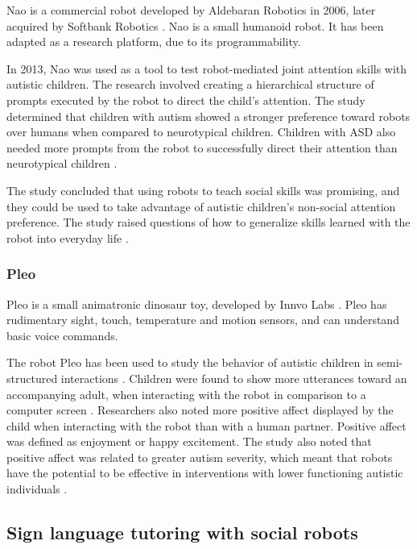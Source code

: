 Nao is a commercial robot developed by Aldebaran Robotics in 2006, later acquired by Softbank Robotics \cite{NaoRef}. Nao is a small humanoid robot. It has been adapted as a research platform, due to its programmability.

In 2013, Nao was used as a tool to test robot-mediated joint attention skills with autistic children. The research involved creating a hierarchical structure of prompts executed by the robot to direct the child's attention. The study determined that children with autism showed a stronger preference toward robots over humans when compared to neurotypical children. Children with ASD also needed more prompts from the robot to successfully direct their attention than neurotypical children \cite{ARIA}.

The study concluded that using robots to teach social skills was promising, and they could be used to take advantage of autistic children's non-social attention preference. The study raised questions of how to generalize skills learned with the robot into everyday life \cite{ARIA}.


\subsubsection{Pleo}

Pleo is a small animatronic dinosaur toy, developed by Innvo Labs \cite{PleoRef}. Pleo has rudimentary sight, touch, temperature and motion sensors, and can understand basic voice commands.

The robot Pleo has been used to study the behavior of autistic children in semi-structured interactions \cite{kim2013social, kim2015potential}. Children were found to show more utterances toward an accompanying adult, when interacting with the robot in comparison to a computer screen \cite{kim2013social}. Researchers also noted more positive affect displayed by the child when interacting with the robot than with a human partner. Positive affect was defined as enjoyment or happy excitement. The study also noted that positive affect was related to greater autism severity, which meant that robots have the potential to be effective in interventions with lower functioning autistic individuals \cite{kim2015potential}.



\subsection{Sign language tutoring with social robots}

